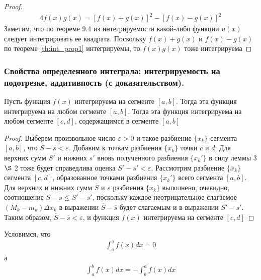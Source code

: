 \documentclass[10pt]{article}
\begin{document}
    \begin{proof}
        \begin{gather*}
            4f(x)g(x) = [f(x) + g(x)]^2 - [f(x) - g(x)]^2
        \end{gather*}
        Заметим, что по теореме 9.4 из интегрируемости какой-либо функции $u(x)$ следует интегрировать ее квадрата. Поскольку $f(x) + g(x)$ и $f(x) - g(x)$ по теореме \ref{th:int_prop1} интегрируемы, то $f(x)g(x)$ тоже интегрируема
    \end{proof}



    \subsubsection{Свойства определенного интеграла: интегрируемость на подотрезке, аддитивность (с доказательством).}
    \begin{theorem}
        Пусть функция $f(x)$ интегрируема на сегменте $[a, b]$. Тогда эта функция интегрируема на любом сегменте $[a, b]$. Тогда эта функция интегрируема на любом сегменте $[c, d]$, содержащимся в сегменте $[a, b]$
        \label{th:int_prop4}
    \end{theorem}
    \begin{proof}
        Выберем произвольное число $\varepsilon > 0$ и такое разбиение $\{x_k\}$  сегмента $[a, b]$, что $S - s < \varepsilon$. Добавим к точкам разбиения $\{x_k\}$ точки $c$ и $d$. Для верхних сумм $S'$ и нижних $s'$ вновь полученного разбиения $\{x_k'\}$ в силу леммы 3 $\S$ 2 тоже будет справедлива оценка $S'-s' < \varepsilon$. Рассмотрим разбиение $\{\overline{x}_k\}$ сегмента $[c, d]$, образованное точками разбиения $\{x_k'\}$ всего сегмента $[a, b]$. Для верхних и нижних сумм $\overline{S}$ и $\overline{s}$ разбиения $\{\overline{x}_k\}$ выполнено, очевидно, соотношение $\overline{S}-\overline{s} \leq S'-s'$, поскольку каждое неотрицательное слагаемое $(M_k - m_k) \Delta x_k$ в выражении $\overline{S} - \overline{s}$ будет слагаемым и в выражении $S'-s'$. Таким образом, $\overline{S} - \overline{s} < \varepsilon$, и функция $f(x)$ интегрируема на сегменте $[c, d]$
    \end{proof}
    \begin{proposition}
        Условимся, что
        \begin{gather*}
            \int_a^a f(x) dx = 0
        \end{gather*}
        а
        \begin{gather*}
            \int_a^b f(x) dx = -\int_b^a f(x) dx
        \end{gather*}
        \label{prop:spec_integrals}
    \end{proposition}
\end{document}
